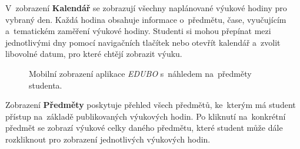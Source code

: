 \documentclass[male,czech,api_bc]{kitheses}
\begin{document}
V~zobrazení \textbf{Kalendář} se zobrazují všechny naplánované výukové hodiny pro vybraný den. Každá hodina obsahuje informace o~předmětu, čase, vyučujícím a~tematickém zaměření výukové hodiny. Studenti si mohou přepínat mezi jednotlivými dny pomocí navigačních tlačítek nebo otevřít kalendář a~zvolit libovolné datum, pro které chtějí zobrazit výuku.

\begin{figure}[H]
	\centering
	\caption{Mobilní zobrazení aplikace \textit{EDUBO} s~náhledem na~předměty studenta.}
	\label{fig:edubo-6}
\end{figure}

Zobrazení \textbf{Předměty} poskytuje přehled všech předmětů, ke~kterým má student přístup na~základě publikovaných výukových hodin. Po kliknutí na~konkrétní předmět se zobrazí výukové celky daného předmětu, které student může dále rozkliknout pro zobrazení jednotlivých výukových hodin.
\end{document}
